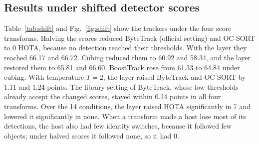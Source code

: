 \documentclass[pdflatex,sn-mathphys-num,iicol]{sn-jnl}
\begin{document}
\subsection{Results under shifted detector scores}\label{sec:shift}
Table~\ref{tab:shift} and Fig.~\ref{fig:shift} show the trackers under the
four score transforms. Halving the scores reduced ByteTrack (official setting)
and OC-SORT to 0 HOTA, because no detection reached their thresholds. With the
layer they reached 66.17 and 66.72. Cubing reduced them to 60.92 and 58.34,
and the layer restored them to 65.81 and 66.60. BoostTrack rose from 61.33 to
64.84 under cubing. With temperature $T=2$, the layer raised ByteTrack and
OC-SORT by 1.11 and 1.24 points. The library setting of ByteTrack, whose low
thresholds already accept the changed scores, stayed within 0.14 points in all
four transforms. Over the 14 conditions, the layer raised HOTA significantly
in 7 and lowered it significantly in none. When a transform made a host lose
most of its detections, the host also had few identity switches, because it
followed few objects; under halved scores it followed none, so it had 0.
\end{document}
